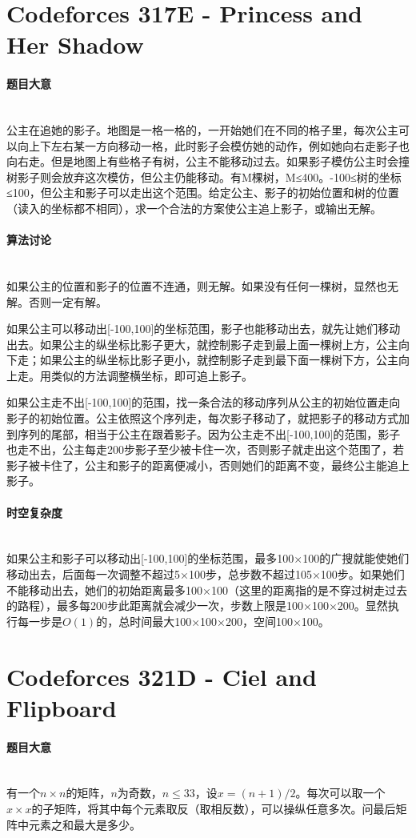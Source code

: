 \documentclass[UTF8]{ctexart}
\newcommand{\myparagraph}[1]{\paragraph{#1}\mbox{}\\}
\theoremstyle{nonumberplain}
\begin{document}
	\section{Codeforces 317E - Princess and Her Shadow}
	
		\myparagraph{题目大意}
		
			公主在追她的影子。地图是一格一格的，一开始她们在不同的格子里，每次公主可以向上下左右某一方向移动一格，此时影子会模仿她的动作，例如她向右走影子也向右走。但是地图上有些格子有树，公主不能移动过去。如果影子模仿公主时会撞树影子则会放弃这次模仿，但公主仍能移动。有M棵树，M≤400。-100≤树的坐标≤100，但公主和影子可以走出这个范围。给定公主、影子的初始位置和树的位置（读入的坐标都不相同），求一个合法的方案使公主追上影子，或输出无解。
		
		\myparagraph{算法讨论}
			
			如果公主的位置和影子的位置不连通，则无解。如果没有任何一棵树，显然也无解。否则一定有解。
			
			如果公主可以移动出[-100,100]的坐标范围，影子也能移动出去，就先让她们移动出去。如果公主的纵坐标比影子更大，就控制影子走到最上面一棵树上方，公主向下走；如果公主的纵坐标比影子更小，就控制影子走到最下面一棵树下方，公主向上走。用类似的方法调整横坐标，即可追上影子。
			
			如果公主走不出[-100,100]的范围，找一条合法的移动序列从公主的初始位置走向影子的初始位置。公主依照这个序列走，每次影子移动了，就把影子的移动方式加到序列的尾部，相当于公主在跟着影子。因为公主走不出[-100,100]的范围，影子也走不出，公主每走200步影子至少被卡住一次，否则影子就走出这个范围了，若影子被卡住了，公主和影子的距离便减小，否则她们的距离不变，最终公主能追上影子。
			
		\myparagraph{时空复杂度}
			
			如果公主和影子可以移动出[-100,100]的坐标范围，最多100×100的广搜就能使她们移动出去，后面每一次调整不超过5×100步，总步数不超过105×100步。如果她们不能移动出去，她们的初始距离最多100×100（这里的距离指的是不穿过树走过去的路程），最多每200步此距离就会减少一次，步数上限是100×100×200。显然执行每一步是$O(1)$的，总时间最大100×100×200，空间100×100。
	
	\section{Codeforces 321D - Ciel and Flipboard}
	
		\myparagraph{题目大意}
		
			有一个$n \times n$的矩阵，$n$为奇数，$n \leq 33$，设$x=(n+1)/2$。每次可以取一个$x \times x$的子矩阵，将其中每个元素取反（取相反数），可以操纵任意多次。问最后矩阵中元素之和最大是多少。
			
\end{document}

